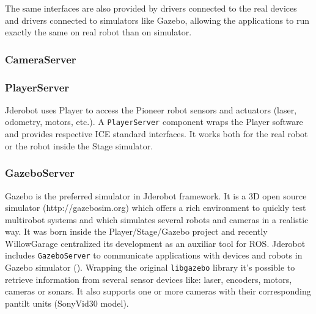 \documentclass[twocolumn]{svjour3}          %
\begin{document}
The same interfaces are also provided by drivers connected to the real devices and drivers connected to simulators like Gazebo, allowing the applications to run exactly the same on real robot than on simulator. 


\subsubsection{CameraServer}


\subsubsection{PlayerServer}

Jderobot uses Player to access the Pioneer robot sensors and actuators (laser, odometry, motors, etc.). A \texttt{PlayerServer} component wraps the Player software and provides respective ICE standard interfaces. It works both for the real robot or the robot inside the Stage simulator.

\subsubsection{GazeboServer}
\label{subsec:gazeboserver}

Gazebo is the preferred simulator in Jderobot framework. It is a 3D open source simulator (http://gazebosim.org) which offers a rich environment to quickly test multirobot systems and which simulates several robots and cameras in a realistic way. It was born inside the Player/Stage/Gazebo project and recently WillowGarage centralized its development as an auxiliar tool for ROS. Jderobot includes \texttt{GazeboServer} to communicate applications with devices and robots in Gazebo simulator (\cite{koening2004}). Wrapping the original \texttt{libgazebo} library it's possible to retrieve information from several sensor devices like: laser, encoders, motors, cameras or sonars. It also supports one or more cameras with their corresponding pantilt units (SonyVid30 model).
\end{document}
